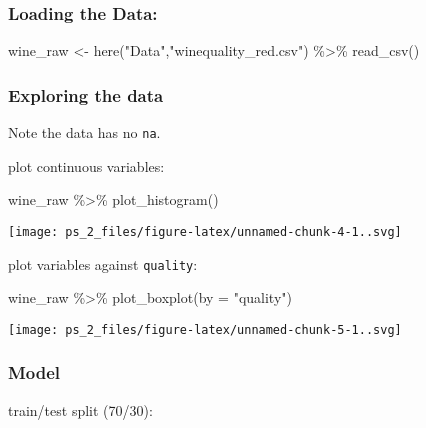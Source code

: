 \documentclass[
]{article}
\newenvironment{Shaded}{\begin{snugshade}}{\end{snugshade}}
\newcommand{\AttributeTok}[1]{\textcolor[rgb]{0.77,0.63,0.00}{#1}}
\newcommand{\FunctionTok}[1]{\textcolor[rgb]{0.00,0.00,0.00}{#1}}
\newcommand{\NormalTok}[1]{#1}
\newcommand{\OtherTok}[1]{\textcolor[rgb]{0.56,0.35,0.01}{#1}}
\newcommand{\SpecialCharTok}[1]{\textcolor[rgb]{0.00,0.00,0.00}{#1}}
\newcommand{\StringTok}[1]{\textcolor[rgb]{0.31,0.60,0.02}{#1}}
\begin{document}
\hypertarget{loading-the-data}{%
\subsubsection{Loading the Data:}\label{loading-the-data}}

\begin{Shaded}
\begin{Highlighting}[]
\NormalTok{wine\_raw }\OtherTok{\textless{}{-}} 
  \FunctionTok{here}\NormalTok{(}\StringTok{"Data"}\NormalTok{,}\StringTok{"winequality\_red.csv"}\NormalTok{) }\SpecialCharTok{\%\textgreater{}\%} 
  \FunctionTok{read\_csv}\NormalTok{()}
\end{Highlighting}
\end{Shaded}

\hypertarget{exploring-the-data}{%
\subsubsection{Exploring the data}\label{exploring-the-data}}

Note the data has no \texttt{na}.

plot continuous variables:

\begin{Shaded}
\begin{Highlighting}[]
\NormalTok{wine\_raw }\SpecialCharTok{\%\textgreater{}\%} 
  \FunctionTok{plot\_histogram}\NormalTok{()}
\end{Highlighting}
\end{Shaded}

\texttt{[image: ps\_2\_files/figure-latex/unnamed-chunk-4-1..svg]}

plot variables against \texttt{quality}:

\begin{Shaded}
\begin{Highlighting}[]
\NormalTok{wine\_raw }\SpecialCharTok{\%\textgreater{}\%} 
  \FunctionTok{plot\_boxplot}\NormalTok{(}\AttributeTok{by =} \StringTok{"quality"}\NormalTok{)}
\end{Highlighting}
\end{Shaded}

\texttt{[image: ps\_2\_files/figure-latex/unnamed-chunk-5-1..svg]}

\hypertarget{model}{%
\subsubsection{Model}\label{model}}

train/test split (70/30):
\end{document}
